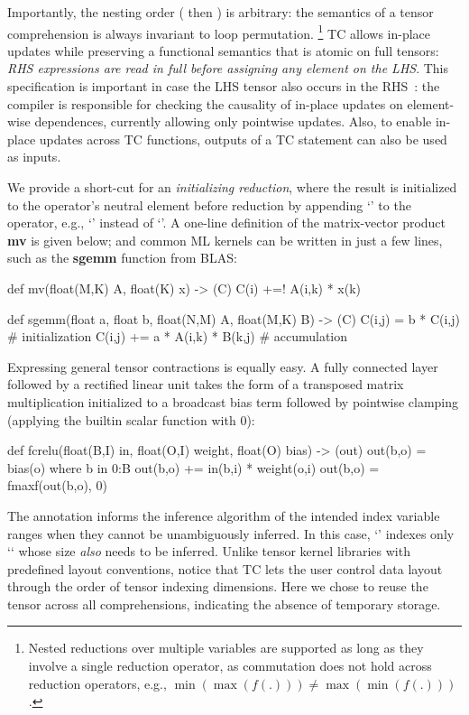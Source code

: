Importantly, the nesting order ( then ) is arbitrary: the
semantics of a tensor comprehension is always invariant to loop permutation.%
\footnote{Nested reductions over multiple variables are supported as long
  as they involve a single reduction operator,
  as commutation does not hold across reduction operators, e.g.,
  $\min(\max(f(.))) \neq \max(\min(f(.)))$.}
TC allows in-place updates while preserving a functional semantics
that is atomic on full tensors: \emph{RHS expressions are read in full before
  assigning any element on the LHS}.
This specification is important in case the LHS tensor also occurs in
the RHS~\cite{FRAGUELA2012465}: the compiler is responsible for checking the
causality of in-place updates on element-wise dependences, currently allowing
only pointwise updates. Also, to enable in-place updates across TC functions,
outputs of a TC statement can also be used as inputs.

We provide a short-cut for an \emph{initializing reduction}, where the result is
initialized to the operator's neutral element before reduction by appending
`\ic{!}' to the operator, e.g., `\ic{+=!}' instead of `\ic{+=}'.  A one-line
definition of the matrix-vector product \textbf{mv} is given below; and
common ML kernels can be written in just a few lines,
such as the \textbf{sgemm} function from BLAS:\label{page:sgemm}
\begin{tclisting}
def mv(float(M,K) A, float(K) x) -> (C)
  { C(i) +=! A(i,k) * x(k) }

def sgemm(float a, float b, float(N,M) A, float(M,K) B) -> (C) {
  C(i,j)  = b * C(i,j)            # initialization
  C(i,j) += a * A(i,k) * B(k,j)   # accumulation
}
\end{tclisting}

Expressing general tensor contractions is equally easy.  A fully
connected layer followed by a rectified linear unit takes the form of
a transposed matrix multiplication initialized to a broadcast bias
term followed by pointwise clamping (applying the builtin
scalar function  with $0$):
\begin{tclisting}
def fcrelu(float(B,I) in, float(O,I) weight, float(O) bias) -> (out) {
  out(b,o)  = bias(o) where b in 0:B
  out(b,o) += in(b,i) * weight(o,i)
  out(b,o)  = fmaxf(out(b,o), 0)
}
\end{tclisting}
The  annotation informs the inference algorithm of the intended index
variable ranges when they cannot be unambiguously inferred.  In this case,
`' indexes only `` whose size \emph{also} needs to be inferred.
Unlike tensor kernel libraries with predefined layout
conventions, notice that TC lets the user control data layout through the order of
tensor indexing dimensions. Here we chose to reuse the  tensor
across all comprehensions, indicating the absence of temporary
storage.

